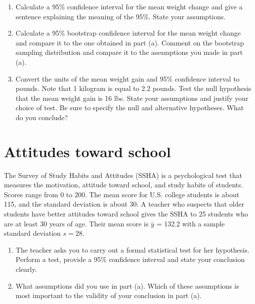 \documentclass[letterpaper,11pt,twoside,]{pinp}
\providecommand{\tightlist}{%
  \setlength{\itemsep}{0pt}\setlength{\parskip}{0pt}}
\begin{document}
\begin{Shaded}
\begin{Highlighting}[]
\OtherTok{\textless{}{-}} \NormalTok{(}\NormalTok{)}
\end{Highlighting}
\end{Shaded}

\begin{enumerate}
\def\labelenumi{\alph{enumi}.}
\item
  Calculate a 95\% confidence interval for the mean weight change and
  give a sentence explaining the meaning of the 95\%. State your
  assumptions.
\item
  Calculate a 95\% bootstrap confidence interval for the mean weight
  change and compare it to the one obtained in part (a). Comment on the
  bootstrap sampling distribution and compare it to the assumptions you
  made in part (a).
\item
  Convert the units of the mean weight gain and 95\% confidence interval
  to pounds. Note that 1 kilogram is equal to 2.2 pounds. Test the null
  hypothesis that the mean weight gain is 16 lbs. State your assumptions
  and justify your choice of test. Be sure to specify the null and
  alternative hypotheses. What do you conclude?
\end{enumerate}

\newpage

\hypertarget{attitudes-toward-school}{%
\section{Attitudes toward school}\label{attitudes-toward-school}}

The Survey of Study Habits and Attitudes (SSHA) is a psychological test
that measures the motivation, attitude toward school, and study habits
of students. Scores range from 0 to 200. The mean score for U.S. college
students is about 115, and the standard deviation is about 30. A teacher
who suspects that older students have better attitudes toward school
gives the SSHA to 25 students who are at least 30 years of age. Their
mean score is \(\bar{y}\) = 132.2 with a sample standard deviation
\(s = 28\).

\begin{enumerate}
\def\labelenumi{\alph{enumi}.}
\tightlist
\item
  The teacher asks you to carry out a formal statistical test for her
  hypothesis. Perform a test, provide a 95\% confidence interval and
  state your conclusion clearly.
\item
  What assumptions did you use in part (a). Which of these assumptions
  is most important to the validity of your conclusion in part (a).
\end{enumerate}
\end{document}

